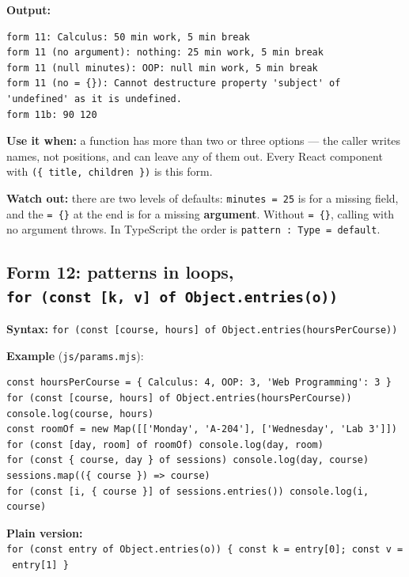 \documentclass[
  10pt,
]{article}
\begin{document}
\textbf{Output:}

\begin{verbatim}
form 11: Calculus: 50 min work, 5 min break
form 11 (no argument): nothing: 25 min work, 5 min break
form 11 (null minutes): OOP: null min work, 5 min break
form 11 (no = {}): Cannot destructure property 'subject' of 'undefined' as it is undefined.
form 11b: 90 120
\end{verbatim}

\textbf{Use it when:} a function has more than two or three options ---
the caller writes names, not positions, and can leave any of them out.
Every React component with \texttt{(\{\ title,\ children\ \})} is this
form.

\textbf{Watch out:} there are two levels of defaults:
\texttt{minutes\ =\ 25} is for a missing field, and the \texttt{=\ \{\}}
at the end is for a missing \textbf{argument}. Without \texttt{=\ \{\}},
calling with no argument throws. In TypeScript the order is
\texttt{pattern\ :\ Type\ =\ default}.

\hypertarget{form-12-patterns-in-loops-for-const-k-v-of-objectentrieso}{%
\subsection{\texorpdfstring{Form 12: patterns in loops,
\texttt{for\ (const\ {[}k,\ v{]\allowbreak{}}\ of\ Object.\allowbreak{}entries(o))}}{Form 12: patterns in loops, }}\label{form-12-patterns-in-loops-for-const-k-v-of-objectentrieso}}

\textbf{Syntax:}
\texttt{for\ (const\ {[}course,\ hours{]\allowbreak{}}\ of\ Object.\allowbreak{}entries(hoursPerCourse))}

\textbf{Example} (\texttt{js/\allowbreak{}params.\allowbreak{}mjs}):

\begin{verbatim}
const hoursPerCourse = { Calculus: 4, OOP: 3, 'Web Programming': 3 }
for (const [course, hours] of Object.entries(hoursPerCourse)) console.log(course, hours)
const roomOf = new Map([['Monday', 'A-204'], ['Wednesday', 'Lab 3']])
for (const [day, room] of roomOf) console.log(day, room)
for (const { course, day } of sessions) console.log(day, course)
sessions.map(({ course }) => course)
for (const [i, { course }] of sessions.entries()) console.log(i, course)
\end{verbatim}

\textbf{Plain version:}
\texttt{for\ (const\ entry\ of\ Object.\allowbreak{}entries(o))\ \{\ const\ k\ =\ entry{[}0{]\allowbreak{}};\ const\ v\ =\ entry{[}1{]\allowbreak{}}\ \}}
\end{document}
